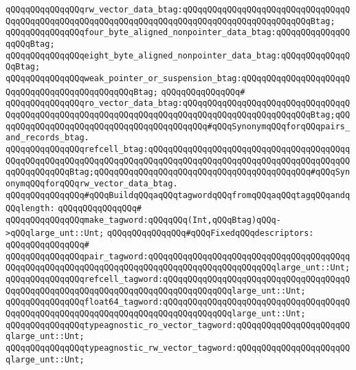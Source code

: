 \verb|qQQqqQQqqQQqqQQqrw_vector_data_btag:qQQqqQQqqQQqqQQqqQQqqQQqqQQqqQQqqQQqqQQqqQQqqQQqqQQqqQQqqQQqqQQqqQQqqQQqqQQqqQQqqQQqqQQqqQQqqQQqBtag;|\newline
\verb|qQQqqQQqqQQqqQQqfour_byte_aligned_nonpointer_data_btag:qQQqqQQqqQQqqQQqqQQqBtag;|\newline
\verb|qQQqqQQqqQQqqQQqeight_byte_aligned_nonpointer_data_btag:qQQqqQQqqQQqqQQqBtag;|\newline
\verb|qQQqqQQqqQQqqQQqweak_pointer_or_suspension_btag:qQQqqQQqqQQqqQQqqQQqqQQqqQQqqQQqqQQqqQQqqQQqqQQqBtag;|\newline
\verb|qQQqqQQqqQQqqQQq#|\newline
\verb|qQQqqQQqqQQqqQQqro_vector_data_btag:qQQqqQQqqQQqqQQqqQQqqQQqqQQqqQQqqQQqqQQqqQQqqQQqqQQqqQQqqQQqqQQqqQQqqQQqqQQqqQQqqQQqqQQqqQQqqQQqBtag;qQQqqQQqqQQqqQQqqQQqqQQqqQQqqQQqqQQqqQQqqQQq#qQQqSynonymqQQqforqQQqpairs_and_records_btag.|\newline
\verb|qQQqqQQqqQQqqQQqrefcell_btag:qQQqqQQqqQQqqQQqqQQqqQQqqQQqqQQqqQQqqQQqqQQqqQQqqQQqqQQqqQQqqQQqqQQqqQQqqQQqqQQqqQQqqQQqqQQqqQQqqQQqqQQqqQQqqQQqqQQqqQQqqQQqBtag;qQQqqQQqqQQqqQQqqQQqqQQqqQQqqQQqqQQqqQQqqQQq#qQQqSynonymqQQqforqQQqrw_vector_data_btag.|\newline
\newline
\verb|qQQqqQQqqQQqqQQq#qQQqBuildqQQqaqQQqtagwordqQQqfromqQQqaqQQqtagqQQqandqQQqlength:|\newline
\verb|qQQqqQQqqQQqqQQq#|\newline
\verb|qQQqqQQqqQQqqQQqmake_tagword:qQQqqQQq(Int,qQQqBtag)qQQq->qQQqlarge_unt::Unt;|\newline
\newline
\verb|qQQqqQQqqQQqqQQq#qQQqFixedqQQqdescriptors:|\newline
\verb|qQQqqQQqqQQqqQQq#|\newline
\verb|qQQqqQQqqQQqqQQqpair_tagword:qQQqqQQqqQQqqQQqqQQqqQQqqQQqqQQqqQQqqQQqqQQqqQQqqQQqqQQqqQQqqQQqqQQqqQQqqQQqqQQqqQQqqQQqqQQqqQQqlarge_unt::Unt;|\newline
\verb|qQQqqQQqqQQqqQQqrefcell_tagword:qQQqqQQqqQQqqQQqqQQqqQQqqQQqqQQqqQQqqQQqqQQqqQQqqQQqqQQqqQQqqQQqqQQqqQQqqQQqqQQqqQQqlarge_unt::Unt;|\newline
\verb|qQQqqQQqqQQqqQQqfloat64_tagword:qQQqqQQqqQQqqQQqqQQqqQQqqQQqqQQqqQQqqQQqqQQqqQQqqQQqqQQqqQQqqQQqqQQqqQQqqQQqqQQqqQQqlarge_unt::Unt;|\newline
\verb|qQQqqQQqqQQqqQQqtypeagnostic_ro_vector_tagword:qQQqqQQqqQQqqQQqqQQqqQQqlarge_unt::Unt;|\newline
\verb|qQQqqQQqqQQqqQQqtypeagnostic_rw_vector_tagword:qQQqqQQqqQQqqQQqqQQqqQQqlarge_unt::Unt;|\newline
